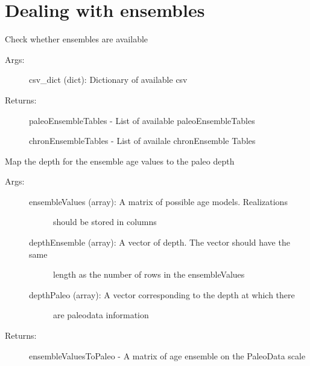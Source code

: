 \documentclass[letterpaper,10pt,english]{sphinxmanual}
\begin{document}
\section{Dealing with ensembles}
\label{\detokenize{LIPDutils:dealing-with-ensembles}}

\begin{fulllineitems}
\label{\detokenize{LIPDutils:pyleoclim.LipdUtils.isEnsemble}}
Check whether ensembles are available
\begin{description}
\item[{Args:}] \leavevmode
csv\_dict (dict): Dictionary of available csv

\item[{Returns:}] \leavevmode
paleoEnsembleTables - List of available paleoEnsembleTables

chronEnsembleTables - List of availale chronEnsemble Tables

\end{description}

\end{fulllineitems}


\begin{fulllineitems}
\label{\detokenize{LIPDutils:pyleoclim.LipdUtils.mapAgeEnsembleToPaleoData}}
Map the depth for the ensemble age values to the paleo depth
\begin{description}
\item[{Args:}] \leavevmode\begin{description}
\item[{ensembleValues (array): A matrix of possible age models. Realizations}] \leavevmode
should be stored in columns

\item[{depthEnsemble (array): A vector of depth. The vector should have the same}] \leavevmode
length as the number of rows in the ensembleValues

\item[{depthPaleo (array): A vector corresponding to the depth at which there}] \leavevmode
are paleodata information

\end{description}

\item[{Returns:}] \leavevmode
ensembleValuesToPaleo - A matrix of age ensemble on the PaleoData scale

\end{description}

\end{fulllineitems}
\end{document}
